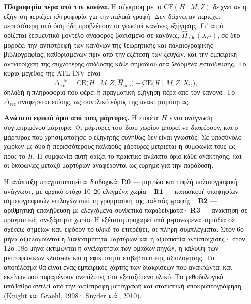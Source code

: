 \documentclass[11pt,a4paper]{article}
\begin{document}
\noindent\textbf{Πληροφορία πέρα από τον κανόνα.} Η σύγκριση με το $\mathrm{CE}(H\mid M,Z)$ δείχνει αν η εξήγηση περιέχει πληροφορία για την παλαιά γραφή. Δεν δείχνει αν περιέχει περισσότερη από όση ήδη προβλέπουν οι γνωστοί κανόνες εξήγησης. Γι' αυτό ορίζεται δεσμευτικό μοντέλο αναφοράς βασισμένο σε κανόνες, $\hat H_{\mathrm{rule}}(X_G)$, σε δύο μορφές: την αντιστροφή των κανόνων της θεωρητικής και παλαιογραφικής βιβλιογραφίας, καθορισμένων πριν από την εξέταση των ζευγών, και την εμπειρική αντιστοίχιση της συχνότερης απόδοσης κάθε σημαδιού στα δεδομένα εκπαίδευσης. Το κύριο μέγεθος της ATL-INV είναι
\[
\Delta^{\mathrm{rule}}_{\mathrm{rec}}=\mathrm{CE}\bigl(H\mid M,Z,\hat H_{\mathrm{rule}}\bigr)-\mathrm{CE}\bigl(H\mid M,Z,X_G\bigr),
\]
δηλαδή η πληροφορία που φέρει η πραγματική εξήγηση πέρα από τον κανόνα. Το $\Delta_{\mathrm{rec}}$ αναφέρεται επίσης, ως συνολικό εύρος της ανακτησιμότητας.

\noindent\textbf{Ανώτατο εφικτό όριο από τους μάρτυρες.} Η ετικέτα $H$ είναι ανάγνωση συγκεκριμένου μάρτυρα. Οι μάρτυρες του ίδιου χωρίου μπορεί να διαφέρουν, και ο μάρτυρας που χρησιμοποίησε ο εξηγητής συνήθως δεν είναι γνωστός. Σε υποσύνολο χωρίων με δύο ή περισσότερους παλαιούς μάρτυρες μετριέται η συμφωνία τους ως προς το $H$. Η συμφωνία αυτή ορίζει το πρακτικό ανώτατο όριο κάθε ανάκτησης, και οι διαφωνίες μεταξύ μαρτύρων αναφέρονται ως εύρημα για την παράδοση.

Η ανάπτυξη πραγματοποιείται διαδοχικά: \textbf{R0} — μητρώο και τυφλή παλαιογραφική ανάγνωση, με αρχικό στόχο 10--20 ελεγμένα χωρία· \textbf{R1} — κατασκευή υποψηφίων σημειογραφικών επιλογών από τη γραμματική της παλαιάς γραφής· \textbf{R2} — αριθμητική επαλήθευση με ελεγχόμενα συνθετικά παραδείγματα· \textbf{R3} — ανάκτηση σε πραγματικά, ανεξάρτητα χωρία. Η εξέταση προχωρεί από μεμονωμένα σημάδια σε σχέσεις σημείων και, εφόσον το υλικό το επιτρέψει, σε πλήρη συμπλέγματα. Στον 6ο μήνα αξιολογούνται η διαθεσιμότητα μαρτύρων και η αξιοπιστία αντιστοίχισης· στον 12ο--18ο μήνα εκτιμώνται η ανεξαρτησία των ομάδων πηγών, η κάλυψη των μετροφωνικών κλάσεων και η εφικτότητα επιβεβαιωτικής αξιολόγησης. Το αποτέλεσμα θα είναι ένας εμπειρικός χάρτης των διακρίσεων που ανακτώνται και εκείνων που παραμένουν ανεπίλυτες στο εξεταζόμενο υλικό. Το μεθοδολογικό υπόβαθρο αντλεί από την αντίστροφη μεταγραφή και στατιστική αποκρυπτογράφηση (Knight και Graehl, 1998· Snyder κ.ά., 2010).
\end{document}
